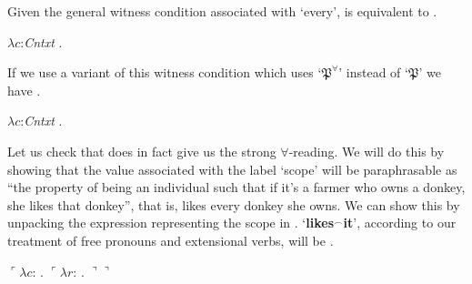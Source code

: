 Given the general witness condition associated with `every', \preveg{} is
equivalent to \nexteg{}.
\begin{ex} 
  $\lambda c$:\textit{Cntxt} . 
\end{ex}
If we use a variant of this witness condition which uses
`$\mathfrak{P}^\forall$' instead of `$\mathfrak{P}$' we have
\nexteg{}.
\begin{ex} 
  $\lambda c$:\textit{Cntxt} . 
\end{ex}
Let us check that \preveg{} does in fact give us the strong
$\forall$-reading.  We will do this by showing that the value
associated with the label `scope' will be paraphrasable as ``the
property of being an individual such that if it's a farmer who owns a
donkey, she likes that donkey'', that is, likes every donkey she
owns. We can show this by unpacking the expression representing the
scope in \preveg{}.  `\textbf{likes}$^\frown$\textbf{it}', according to
our treatment of free pronouns and extensional verbs, will be
\nexteg{}.
\begin{ex} 
  $\ulcorner\lambda c$: .
  $\ulcorner\lambda r$: . $\urcorner\urcorner$
\end{ex}
